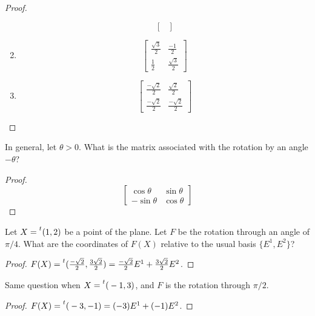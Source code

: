 \begin{proof}
\begin{enumerate}[label={(\alph*)}]
\[\begin{bmatrix}
                  \end{bmatrix}
              \]
        \item \[
                  \begin{bmatrix}
                      \frac{\sqrt{3}}{2} & \frac{-1}{2}       \\
                      \frac{1}{2}        & \frac{\sqrt{3}}{2}
                  \end{bmatrix}
              \]
        \item \[
                  \begin{bmatrix}
                      \frac{-\sqrt{2}}{2} & \frac{\sqrt{2}}{2}  \\
                      \frac{-\sqrt{2}}{2} & \frac{-\sqrt{2}}{2}
                  \end{bmatrix}
              \]
    \end{enumerate}
\end{proof}

\begin{exercise}
    In general, let $\theta > 0$. What is the matrix associated with the rotation by an angle $-\theta$?
\end{exercise}

\begin{proof}
    \[
        \begin{bmatrix}
            \cos\theta  & \sin\theta \\
            -\sin\theta & \cos\theta
        \end{bmatrix}
    \]
\end{proof}

\begin{exercise}
    Let $X = \prescript{t}{}(1, 2)$ be a point of the plane. Let $F$ be the rotation through an angle of $\pi/4$. What are the coordinates of $F(X)$ relative to the usual basis $\{ E^{1}, E^{2} \}$?
\end{exercise}

\begin{proof}
    $F(X) = \prescript{t}{}(\frac{-\sqrt{2}}{2}, \frac{3\sqrt{2}}{2}) = \frac{-\sqrt{2}}{2}E^{1} + \frac{3\sqrt{2}}{2}E^{2}$.
\end{proof}

\begin{exercise}
    Same question when $X = \prescript{t}{}(-1, 3)$, and $F$ is the rotation through $\pi/2$.
\end{exercise}

\begin{proof}
    $F(X) = \prescript{t}{}(-3, -1) = (-3)E^{1} + (-1)E^{2}$.
\end{proof}

